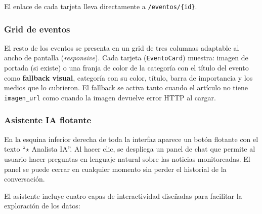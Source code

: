 \documentclass[12pt,a4paper]{article}
\begin{document}
El enlace de cada tarjeta lleva directamente a \texttt{/eventos/\{id\}}.

\subsubsection*{Grid de eventos}

El resto de los eventos se presenta en un grid de tres columnas adaptable al ancho de pantalla (\textit{responsive}). Cada tarjeta (\texttt{EventoCard}) muestra: imagen de portada (si existe) o una franja de color de la categoría con el título del evento como \textbf{fallback visual}, categoría con su color, título, barra de importancia y los medios que lo cubrieron. El fallback se activa tanto cuando el artículo no tiene \texttt{imagen\_url} como cuando la imagen devuelve error HTTP al cargar.

\subsubsection*{Asistente IA flotante}

En la esquina inferior derecha de toda la interfaz aparece un botón flotante con el texto ``$\star$ Analista IA''. Al hacer clic, se despliega un panel de chat que permite al usuario hacer preguntas en lenguaje natural sobre las noticias monitoreadas. El panel se puede cerrar en cualquier momento sin perder el historial de la conversación.

El asistente incluye cuatro capas de interactividad diseñadas para facilitar la exploración de los datos:
\end{document}
